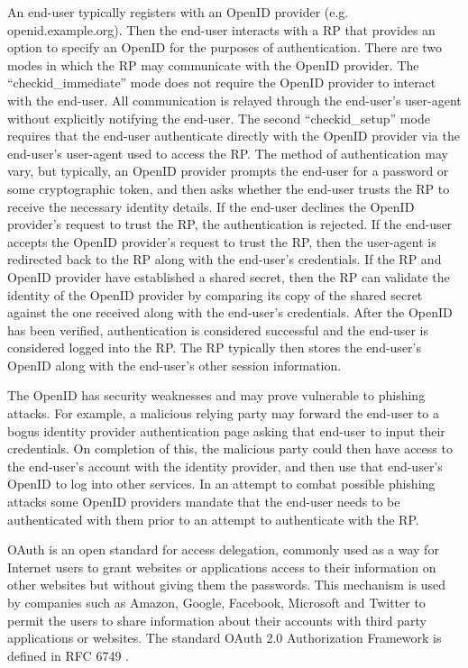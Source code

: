 \begin{multicols}{2}
An end-user typically registers with an OpenID provider (e.g. openid.example.org). Then the end-user interacts with a RP that provides an option to specify an OpenID for the purposes of authentication. There are two modes in which the RP may communicate with the OpenID provider. The ``checkid\_immediate'' mode does not require the OpenID provider to interact with the end-user. All communication is relayed through the end-user's user-agent without explicitly notifying the end-user. The second ``checkid\_setup'' mode requires that the end-user authenticate directly with the OpenID provider via the end-user's user-agent used to access the RP. The method of authentication may vary, but typically, an OpenID provider prompts the end-user for a password or some cryptographic token, and then asks whether the end-user trusts the RP to receive the necessary identity details. If the end-user declines the OpenID provider's request to trust the RP, the authentication is rejected. If the end-user accepts the OpenID provider's request to trust the RP, then the user-agent is redirected back to the RP along with the end-user's credentials. If the RP and OpenID provider have established a shared secret, then the RP can validate the identity of the OpenID provider by comparing its copy of the shared secret against the one received along with the end-user's credentials. After the OpenID has been verified, authentication is considered successful and the end-user is considered logged into the RP. The RP typically then stores the end-user's OpenID along with the end-user's other session information.

The OpenID has security weaknesses and may prove vulnerable to phishing attacks. For example, a malicious relying party may forward the end-user to a bogus identity provider authentication page asking that end-user to input their credentials. On completion of this, the malicious party could then have access to the end-user's account with the identity provider, and then use that end-user's OpenID to log into other services. In an attempt to combat possible phishing attacks some OpenID providers mandate that the end-user needs to be authenticated with them prior to an attempt to authenticate with the RP.

OAuth is an open standard for access delegation, commonly used as a way for Internet users to grant websites or applications access to their information on other websites but without giving them the passwords. This mechanism is used by companies such as Amazon, Google, Facebook, Microsoft and Twitter to permit the users to share information about their accounts with third party applications or websites. The standard OAuth 2.0 Authorization Framework is defined in RFC 6749 \cite{chap2-key26}.


\end{multicols}
